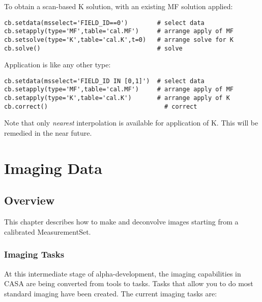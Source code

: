 To obtain a scan-based K solution, with an existing MF solution
applied: 

\small
\begin{verbatim}
cb.setdata(msselect='FIELD_ID==0')        # select data
cb.setapply(type='MF',table='cal.MF')     # arrange apply of MF
cb.setsolve(type='K',table='cal.K',t=0)   # arrange solve for K
cb.solve()                                # solve
\end{verbatim}
\normalsize

Application is like any other type:

\small
\begin{verbatim}
cb.setdata(msselect='FIELD_ID IN [0,1]')  # select data
cb.setapply(type='MF',table='cal.MF')     # arrange apply of MF
cb.setapply(type='K',table='cal.K')       # arrange apply of K
cb.correct()                                # correct
\end{verbatim}
\normalsize

Note that only {\it nearest} interpolation is available for
application of K.  This will be remedied in the near future.



\chapter{Imaging Data}
\label{chapter:synth.image}

\section{Overview}
\label{section:im.overview}

This chapter describes how to make and deconvolve images starting
from a calibrated MeasurementSet.  

\subsection{Imaging Tasks}
\label{subsection:image.tasks}

At this intermediate stage of alpha-development, the imaging
capabilities in CASA are being converted from tools to tasks.  Tasks
that allow you to do most standard imaging have been created.  The
current imaging tasks are:

